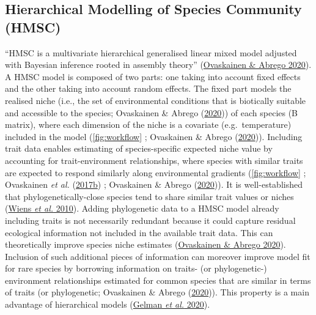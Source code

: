 \documentclass[9pt,biorxiv,doublespacing,lineno]{lapreprint}
\begin{document}
\hypertarget{hierarchical-modelling-of-species-community-hmsc}{%
\subsection{Hierarchical Modelling of Species Community
(HMSC)}\label{hierarchical-modelling-of-species-community-hmsc}}

``HMSC is a multivariate hierarchical generalised linear mixed model
adjusted with Bayesian inference rooted in assembly theory''
(\protect\hyperlink{ref-Ovaskainen_2020}{Ovaskainen \& Abrego 2020}). A
HMSC model is composed of two parts: one taking into account fixed
effects and the other taking into account random effects. The fixed part
models the realised niche (i.e., the set of environmental conditions
that is biotically suitable and accessible to the species; Ovaskainen \&
Abrego (\protect\hyperlink{ref-Ovaskainen_2020}{2020})) of each species
(B matrix), where each dimension of the niche is a covariate
(e.g.~temperature) included in the model (\cref{fig:workflow} ;
Ovaskainen \& Abrego (\protect\hyperlink{ref-Ovaskainen_2020}{2020})).
Including trait data enables estimating of species-specific expected
niche value by accounting for trait-environment relationships, where
species with similar traits are expected to respond similarly along
environmental gradients (\cref{fig:workflow} ; Ovaskainen \emph{et al.}
(\protect\hyperlink{ref-Ovaskainen_2017a}{2017b}) ; Ovaskainen \& Abrego
(\protect\hyperlink{ref-Ovaskainen_2020}{2020})). It is well-established
that phylogenetically-close species tend to share similar trait values
or niches (\protect\hyperlink{ref-Wiens_2010}{Wiens \emph{et al.}
2010}). Adding phylogenetic data to a HMSC model already including
traits is not necessarily redundant because it could capture residual
ecological information not included in the available trait data. This
can theoretically improve species niche estimates
(\protect\hyperlink{ref-Ovaskainen_2020}{Ovaskainen \& Abrego 2020}).
Inclusion of such additional pieces of information can moreover improve
model fit for rare species by borrowing information on traits- (or
phylogenetic-) environment relationships estimated for common species
that are similar in terms of traits (or phylogenetic; Ovaskainen \&
Abrego (\protect\hyperlink{ref-Ovaskainen_2020}{2020})). This property
is a main advantage of hierarchical models
(\protect\hyperlink{ref-Gelman_2020}{Gelman \emph{et al.} 2020}).
\end{document}
